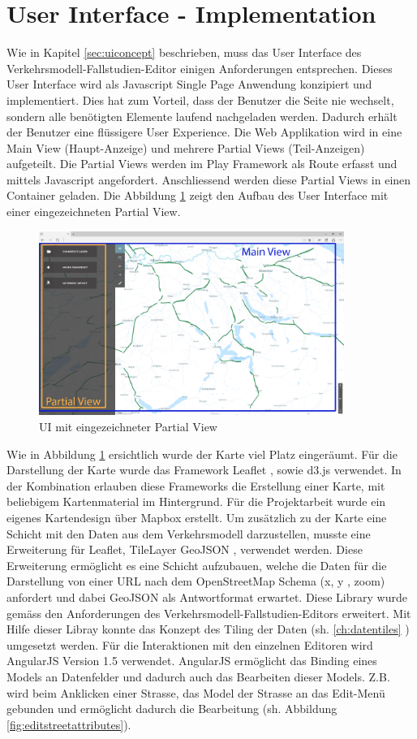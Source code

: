 \section{User Interface - Implementation}
Wie in Kapitel \ref{sec:uiconcept}  beschrieben, muss das User Interface des Verkehrsmodell-Fallstudien-Editor einigen Anforderungen entsprechen. Dieses User Interface wird als Javascript Single Page Anwendung konzipiert und implementiert. Dies hat zum Vorteil, dass der Benutzer die Seite nie wechselt, sondern alle benötigten Elemente laufend nachgeladen werden. Dadurch erhält der Benutzer eine flüssigere User Experience. Die Web Applikation wird in eine Main View (Haupt-Anzeige) und mehrere Partial Views (Teil-Anzeigen) aufgeteilt. Die Partial Views werden im Play Framework als Route erfasst und mittels Javascript angefordert. Anschliessend werden diese Partial Views in einen Container geladen. Die Abbildung \ref{fig:mainviewpartialview} zeigt den Aufbau des User Interface mit einer eingezeichneten Partial View.
\begin{figure}[H]
\centering
\includegraphics[height=6cm]{images/MainviewPartialview.PNG}
\caption{UI mit eingezeichneter Partial View}
\label{fig:mainviewpartialview}
\end{figure}
\noindent
Wie in Abbildung \ref{fig:mainviewpartialview} ersichtlich wurde der Karte viel Platz eingeräumt. Für die Darstellung der Karte wurde das Framework Leaflet \cite{Leaflet}, sowie d3.js \cite{D3JS} verwendet. In der Kombination erlauben diese Frameworks die Erstellung einer Karte, mit beliebigem Kartenmaterial im Hintergrund. Für die Projektarbeit wurde ein eigenes Kartendesign über Mapbox \cite{Mapbox} erstellt. Um zusätzlich zu der Karte eine Schicht mit den Daten aus dem Verkehrsmodell darzustellen, musste eine Erweiterung für Leaflet, TileLayer GeoJSON \cite{LeafletGeoJSON},  verwendet werden. Diese Erweiterung ermöglicht es eine Schicht aufzubauen, welche die Daten für die Darstellung von einer URL nach dem OpenStreetMap Schema (x, y , zoom) anfordert und dabei GeoJSON als Antwortformat erwartet. Diese Library wurde gemäss den Anforderungen des Verkehrsmodell-Fallstudien-Editors erweitert. Mit Hilfe dieser Libray konnte das Konzept des Tiling der Daten (sh. \ref{ch:datentiles} ) umgesetzt werden. Für die Interaktionen mit den einzelnen Editoren wird AngularJS \cite{AngularJS} Version 1.5 verwendet. AngularJS ermöglicht das Binding eines Models an Datenfelder und dadurch auch das Bearbeiten dieser Models. Z.B. wird beim Anklicken einer Strasse, das Model der Strasse an das Edit-Menü gebunden und ermöglicht dadurch die Bearbeitung (sh. Abbildung \ref{fig:editstreetattributes}).
